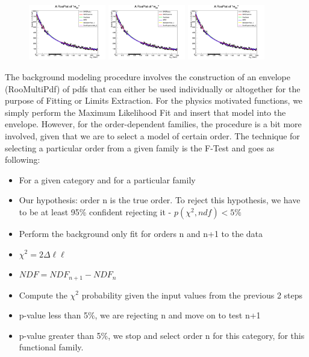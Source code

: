 \begin{figure}[hbp]
     \centering
     \includegraphics[width=0.3\textwidth]{figures/ch_higgs/backgroundmodel/baseline_110to160_p25GeV/backgroundFits__01JetsTightBB__bkgModels.png}
     \includegraphics[width=0.3\textwidth]{figures/ch_higgs/backgroundmodel/baseline_110to160_p25GeV/backgroundFits__01JetsTightBB__bkgModels.png}
     \includegraphics[width=0.3\textwidth]{figures/ch_higgs/backgroundmodel/baseline_110to160_p25GeV/backgroundFits__01JetsTightBB__bkgModels.png}
     \caption{}
     \label{fig:higgs_backgroundmodel_exampleModels}
 \end{figure}

The background modeling procedure involves the construction of an envelope (RooMultiPdf) of pdfs that can either be used individually or altogether for the purpose of Fitting or Limits Extraction. For the physics motivated functions, we simply perform the Maximum Likelihood Fit and insert that model into the envelope. However, for the order-dependent families, the procedure is a bit more involved, given that we are to select a model of certain order. The technique for selecting a particular order from a given family is the F-Test and goes as following:

\begin{itemize}
    \item For a given category and for a particular family
    \item Our hypothesis: order n is the true order. To reject this hypothesis, we have to be at least 95\% confident rejecting it - $p(\chi^2, ndf) < 5\%$
    \item Perform the background only fit for orders n and n+1 to the data
    \item $\chi^2 = 2 \Delta \ell\ell$
    \item $NDF = NDF_{n+1} - NDF_{n}$
    \item Compute the $\chi^2$ probability given the input values from the previous 2 steps
    \item p-value less than 5\%, we are rejecting n and move on to test n+1
    \item p-value greater than 5\%, we stop and select order n for this category, for this functional family.
\end{itemize}

